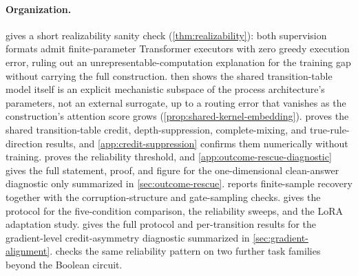 \documentclass{article}
\begin{document}
\clearpage
\appendix
{}
\raggedbottom
\setlength{\parskip}{2pt plus 1pt minus 1pt}
\setlength{\abovedisplayskip}{8pt plus 2pt minus 2pt}
\setlength{\belowdisplayskip}{8pt plus 2pt minus 2pt}

\paragraph{Organization.}
 gives a short realizability sanity check
(\cref{thm:realizability}): both supervision formats admit finite-parameter
Transformer executors with zero greedy execution error, ruling out an
unrepresentable-computation explanation for the training gap without
carrying the full construction.  then
shows the shared transition-table model itself is an explicit mechanistic
subspace of the process architecture's parameters, not an external
surrogate, up to a routing error that vanishes as the construction's
attention score grows (\cref{prop:shared-kernel-embedding}).
 proves the
shared transition-table credit, depth-suppression, complete-mixing, and
true-rule-direction results, and \cref{app:credit-suppression} confirms
them numerically without training.  proves
the reliability threshold, and \cref{app:outcome-rescue-diagnostic} gives
the full statement, proof, and figure for the one-dimensional clean-answer
diagnostic only summarized in \cref{sec:outcome-rescue}.
 reports finite-sample recovery together with
the corruption-structure and gate-sampling checks. 
gives the protocol for the five-condition comparison, the reliability
sweeps, and the LoRA adaptation study.  gives
the full protocol and per-transition results for the gradient-level
credit-asymmetry diagnostic summarized in \cref{sec:gradient-alignment}.
 checks the same reliability pattern on two
further task families beyond the Boolean circuit.




\end{document}
